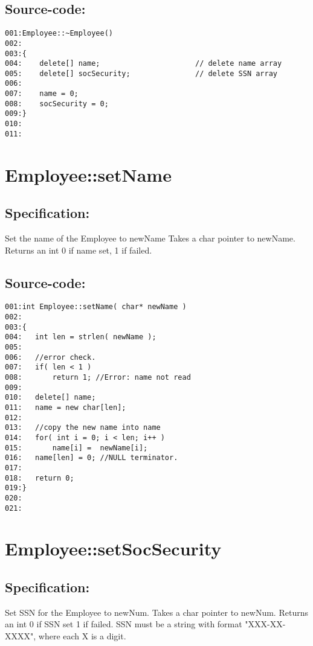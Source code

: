 \subsection*{Source-code:}
\begin{verbatim}
001:Employee::~Employee()
002:
003:{
004:    delete[] name;                      // delete name array
005:    delete[] socSecurity;               // delete SSN array
006:
007:    name = 0;
008:    socSecurity = 0;
009:}
010:
011:
\end{verbatim}
\section{Employee::setName}
\subsection*{Specification:}
Set the name of the Employee to newName
  Takes a char pointer to newName.
  Returns an int 0 if name set, 1 if failed.
\subsection*{Source-code:}
\begin{verbatim}
001:int Employee::setName( char* newName )
002:  
003:{
004:   int len = strlen( newName );
005:
006:   //error check.
007:   if( len < 1 ) 
008:       return 1; //Error: name not read
009:
010:   delete[] name;
011:   name = new char[len];
012:
013:   //copy the new name into name
014:   for( int i = 0; i < len; i++ ) 
015:       name[i] =  newName[i];
016:   name[len] = 0; //NULL terminator.
017:
018:   return 0;
019:}
020:
021:
\end{verbatim}
\section{Employee::setSocSecurity}
\subsection*{Specification:}
Set SSN for the Employee to newNum.
  Takes a char pointer to newNum.
  Returns an int 0 if SSN set 1 if failed.
  SSN must be a string with format "XXX-XX-XXXX",
  where each X is a digit.
